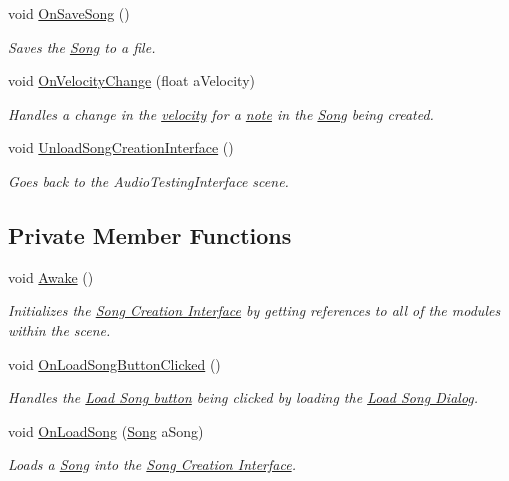 \begin{DoxyCompactItemize}
void \hyperlink{group___s_c_m_handlers_gafd5e9f72e7a15cb77994c59fbbf8b769}{On\+Save\+Song} ()
\begin{DoxyCompactList}\small\item\em Saves the \hyperlink{class_song}{Song} to a file. \end{DoxyCompactList}\item 
void \hyperlink{group___s_c_m_handlers_ga45e79bb31be34e3e2cc47bd6a6563b40}{On\+Velocity\+Change} (float a\+Velocity)
\begin{DoxyCompactList}\small\item\em Handles a change in the \hyperlink{group___audio_DefVel}{velocity} for a \hyperlink{group___music_structs_struct_music_1_1_combined_note}{note} in the \hyperlink{class_song}{Song} being created. \end{DoxyCompactList}\item 
void \hyperlink{group___s_c_m_handlers_gac39b0d849c680dda1e047c3e7d848b51}{Unload\+Song\+Creation\+Interface} ()
\begin{DoxyCompactList}\small\item\em Goes back to the Audio\+Testing\+Interface scene. \end{DoxyCompactList}\end{DoxyCompactItemize}
\subsection*{Private Member Functions}
\begin{DoxyCompactItemize}
\item 
void \hyperlink{group___s_c_m_unity_ga2747d8e56d35acf19b90525b861cc7dd}{Awake} ()
\begin{DoxyCompactList}\small\item\em Initializes the \hyperlink{group___doc_s_c}{Song Creation Interface} by getting references to all of the modules within the scene. \end{DoxyCompactList}\item 
void \hyperlink{group___s_c_m_handlers_ga1747d021ddb36a8c2c172315d6fbb3a8}{On\+Load\+Song\+Button\+Clicked} ()
\begin{DoxyCompactList}\small\item\em Handles the \hyperlink{group___s_c_m_priv_var_ga7851ecd194d87e14fa186fc76e154222}{Load Song button} being clicked by loading the \hyperlink{group___doc_s_c___l_s_d}{Load Song Dialog}. \end{DoxyCompactList}\item 
void \hyperlink{group___s_c_m_handlers_gae3791e700c2e12f1dd705c4b951ec260}{On\+Load\+Song} (\hyperlink{class_song}{Song} a\+Song)
\begin{DoxyCompactList}\small\item\em Loads a \hyperlink{class_song}{Song} into the \hyperlink{group___doc_s_c}{Song Creation Interface}. \end{DoxyCompactList}\end{DoxyCompactItemize}
